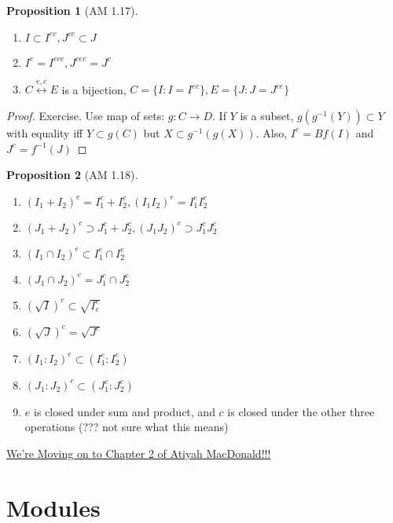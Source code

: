 \documentclass{article}
\theoremstyle{definition}
\newtheorem{proposition}{Proposition}
\begin{document}
\begin{proposition}
    [AM 1.17]

    \begin{enumerate}
        \item \(I \subset I^{ec} , J^{ce} \subset J\) 
        \item \(I^e = I^{ece} , J^{cec} = J^c\) 
        \item \(C \overset{e,c}{\longleftrightarrow} E\) is a bijection, \(C=\{ I:I=I^{ec} \}, E=\{ J:J=J^{ce} \}  \)  
    \end{enumerate}

\end{proposition}

\begin{proof}
    Exercise. Use map of sets: \(g:C\to D\). If \(Y\) is a subset, \(g(g^{-1}(Y))\subset Y\) with equality iff \(Y\subset g(C)\) but \(X\subset g^{-1} (g(X))\). Also, \(I^e = Bf(I)\) and \(J^c = f^{-1}(J)\) 
\end{proof}

\begin{proposition}
    [AM 1.18]

    \begin{enumerate}
        \item \((I_1 + I_2)^e = I_1^e + I_2^e,(I_1 I_2)^e = I_1^e I_2^e\)
        \item \((J_1 + J_2)^c \supset J_1 ^ c + J_2 ^ c,(J_1 J_2)^c \supset J_1^c J_2^c\)
        \item \((I_1 \cap I_2)^e \subset I_1 ^ e \cap I_2^e\) 
        \item \((J_1 \cap J_2)^c = J_1^c \cap J_2^c\) 
        \item \((\sqrt{I} )^e \subset \sqrt{I_e^e}\)
        \item \((\sqrt{J})^c = \sqrt{J^c} \)
        \item \((I_1 : I_2)^e \subset (I_1^e : I_2^e)\)
        \item \((J_1 : J_2)^c \subset (J_1^c : J_2^c)\) 
        \item \(e\) is closed under sum and product, and \(c\) is closed under the other three operations (??? not sure what this means) 
    \end{enumerate}

\end{proposition}

\underline{We're Moving on to Chapter 2 of Atiyah MacDonald!!!}

\section*{Modules}
\end{document}
